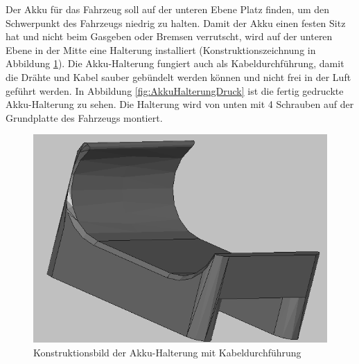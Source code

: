 Der Akku für das Fahrzeug soll auf der unteren Ebene Platz finden, um den Schwerpunkt des Fahrzeugs niedrig zu halten. Damit der Akku einen festen Sitz hat und nicht beim Gasgeben oder Bremsen verrutscht, wird auf der unteren Ebene in der Mitte eine Halterung installiert (Konstruktionszeichnung in Abbildung \ref{fig:AkkuHalterungKonstruktion}). Die Akku-Halterung fungiert auch als Kabeldurchführung, damit die Drähte und Kabel sauber gebündelt werden können und nicht frei in der Luft geführt werden. In Abbildung \ref{fig:AkkuHalterungDruck} ist die fertig gedruckte Akku-Halterung zu sehen. Die Halterung wird von unten mit 4 Schrauben auf der Grundplatte des Fahrzeugs montiert.

\begin{minipage}[b]{0.49\textwidth}
\centering
\begin{figure}[H] %
\includegraphics[width=.85\textwidth]{sec2/images/3DAnbaukomponenten/Konstruktionsbilder/AkkuHalterungKonstruktion} 
\centering
\captionsetup{width=.9\textwidth}
\caption[Konstruktionsbild der Akku-Halterung]{Konstruktionsbild der Akku-Halterung mit Kabeldurchführung}\centering
\label{fig:AkkuHalterungKonstruktion}
\end{figure}
\end{minipage}
